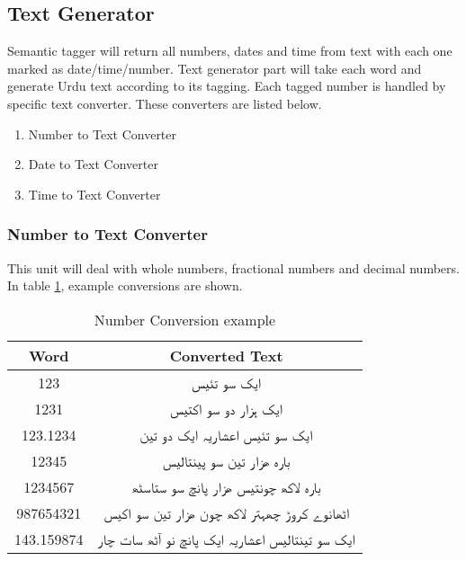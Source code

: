 \subsection{Text Generator}
Semantic tagger will return all numbers, dates and time from text with each one marked as date/time/number. Text generator part will take each word and generate Urdu text according to its tagging. Each tagged number is handled by specific text converter. These converters are listed below.

\begin{enumerate}
  \item Number to Text Converter
  \item Date to Text Converter 
  \item Time to Text Converter
\end{enumerate}

\subsubsection{Number to Text Converter}
This unit will deal with whole numbers, fractional numbers and decimal numbers. In table \ref{table:no_conversion_example}, example conversions are shown. 

\begin{table}[]
\centering
\begin{tabular}{|c|c|}
\hline
\textbf{Word} & \textbf{Converted Text}                          \\ \hline
123           & \texturdu{ایک سو تئیس}                                     \\ \hline
1231          & \texturdu{ایک ہزار دو سو اکتیس}                            \\ \hline
123.1234      & \texturdu{ایک سو تئیس اعشاریہ ایک دو تین}                   \\ \hline
12345         & \texturdu{بارہ ھزار تین سو پینتالیس}                        \\ \hline
1234567       & \texturdu{بارہ لاکھ چونتیس ھزار پانچ سو ستاسٹھ}             \\ \hline
987654321     & \texturdu{اٹھانوے کروڑ  چھہتر لاکھ   چون ھزار تین سو اکیس}  \\ \hline
143.159874    & \texturdu{ایک سو تینتالیس  اعشاریہ ایک پانچ نو آٹھ سات چار} \\ \hline
\end{tabular}
\caption{Number Conversion example}
\label{table:no_conversion_example}
\end{table}

